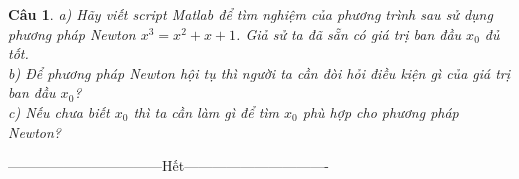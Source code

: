 \documentclass[11pt]{article}
\newtheorem{bt}{Câu}
\begin{document}
\begin{bt}
a) Hãy viết script Matlab để tìm nghiệm của phương trình sau sử dụng phương pháp Newton $x^3 = x^2 + x + 1$. Giả sử ta đã sẵn có giá trị ban đầu $x_0$ đủ tốt. \\
b) Để phương pháp Newton hội tụ thì người ta cần đòi hỏi điều kiện gì của giá trị ban đầu $x_0$? \\
c) Nếu chưa biết $x_0$ thì ta cần làm gì để tìm $x_0$ phù hợp cho phương pháp Newton? 
\end{bt}

\centerline{———————————Hết——————————-}
\end{document}
